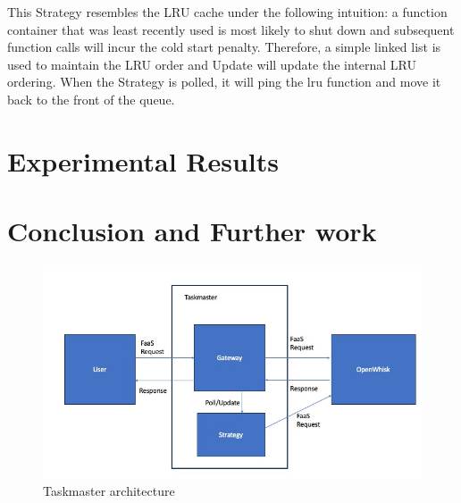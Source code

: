 \documentclass{article}
\begin{document}
This Strategy resembles the LRU cache under the following intuition: a function container that was least recently used is most likely to shut down and subsequent function calls will incur the cold start penalty. Therefore, a simple linked list is used to maintain the LRU order and Update will update the internal LRU ordering. When the Strategy is polled, it will ping the lru function and move it back to the front of the queue.

\section{Experimental Results}

\section{Conclusion and Further work}



\begin{figure}
    \begin{center}
        \includegraphics[width=\textwidth]{architecture.jpg}
    \end{center}
    \label{fig:taskmaster}
    \caption{Taskmaster architecture}
\end{figure}



\end{document}

